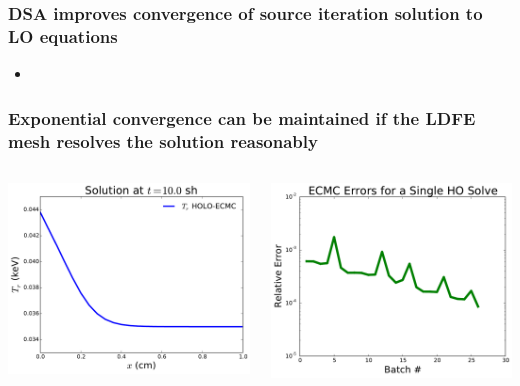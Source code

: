 \documentclass[xcolor=dvipsnames,hyperref={pdfpagelabels=false},unknownkeysallowed,
handout]{beamer}
\newlength{\wideitemsep}
\let\olditem\item
\renewcommand{\item}{\setlength{\itemsep}{\wideitemsep}\olditem}
\begin{document}
\begin{frame}
    \frametitle{DSA improves convergence of source iteration solution to LO
    equations}
    \begin{itemize}
        \item[] 
    \end{itemize}

\end{frame}


\begin{frame}
    \frametitle{Exponential convergence can be maintained if the LDFE mesh resolves the solution reasonably}
    \begin{columns}
    \begin{column}{0.5\textwidth}
        \vspace{0pt}
  \centering
    \includegraphics[width=\linewidth]{heated_marshak_new.pdf}
    \end{column}
    \begin{column}{0.5\textwidth}
        \vspace{0pt}
        \centering
        \includegraphics[width=\linewidth]{errors.pdf}
    \end{column}
\end{columns}
\end{frame}
\end{document}
